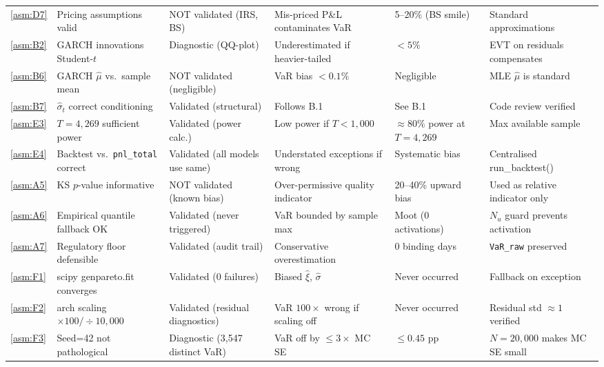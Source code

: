 \documentclass[11pt,a4paper]{article}
\newcommand{\code}[1]{\texttt{#1}}
\begin{document}
\begin{footnotesize}
\begin{longtable}{@{}p{0.65cm} p{4.0cm} p{2.6cm} p{3.4cm} p{2.0cm} p{2.8cm}@{}}
\cref{asm:D7}  & Pricing assumptions valid & NOT validated (IRS, BS) & Mis-priced P\&L contaminates VaR & 5--20\% (BS smile) & Standard approximations \\[4pt]

\cref{asm:B2}  & GARCH innovations Student-$t$ & Diagnostic (QQ-plot) & Underestimated if heavier-tailed & $<5\%$ & EVT on residuals compensates \\[4pt]

\cref{asm:B6}  & GARCH $\hat{\mu}$ vs.\ sample mean & NOT validated (negligible) & VaR bias $<0.1\%$ & Negligible & MLE $\hat{\mu}$ is standard \\[4pt]

\cref{asm:B7}  & $\hat{\sigma}_t$ correct conditioning & Validated (structural) & Follows B.1 & See B.1 & Code review verified \\[4pt]

\cref{asm:E3}  & $T=4{,}269$ sufficient power & Validated (power calc.) & Low power if $T<1{,}000$ & $\approx 80\%$ power at $T=4{,}269$ & Max available sample \\[4pt]

\cref{asm:E4}  & Backtest vs.\ \code{pnl\_total} correct & Validated (all models use same) & Understated exceptions if wrong & Systematic bias & Centralised run\_backtest() \\[4pt]

\cref{asm:A5}  & KS $p$-value informative & NOT validated (known bias) & Over-permissive quality indicator & 20--40\% upward bias & Used as relative indicator only \\[4pt]

\cref{asm:A6}  & Empirical quantile fallback OK & Validated (never triggered) & VaR bounded by sample max & Moot (0 activations) & $N_u$ guard prevents activation \\[4pt]

\cref{asm:A7}  & Regulatory floor defensible & Validated (audit trail) & Conservative overestimation & 0 binding days & \code{VaR\_raw} preserved \\[4pt]

\cref{asm:F1}  & scipy genpareto.fit converges & Validated (0 failures) & Biased $\hat{\xi}$, $\hat{\sigma}$ & Never occurred & Fallback on exception \\[4pt]

\cref{asm:F2}  & arch scaling $\times100/\div10{,}000$ & Validated (residual diagnostics) & VaR $100\times$ wrong if scaling off & Never occurred & Residual std $\approx 1$ verified \\[4pt]

\cref{asm:F3}  & Seed=42 not pathological & Diagnostic (3{,}547 distinct VaR) & VaR off by $\le 3\times$ MC SE & $\le 0.45$ pp & $N=20{,}000$ makes MC SE small \\[4pt]

\end{longtable}
\end{footnotesize}
\end{document}
